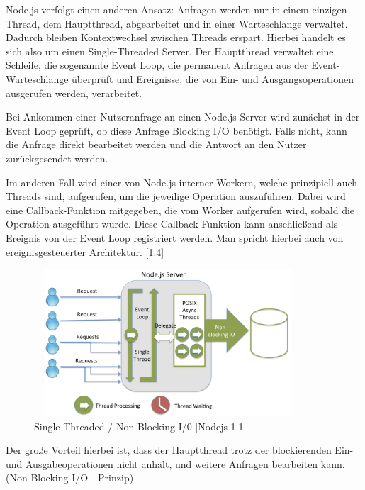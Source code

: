 \newpage

Node.js verfolgt einen anderen Ansatz: Anfragen werden nur in einem einzigen Thread, dem Hauptthread, abgearbeitet und in einer Warteschlange verwaltet. Dadurch bleiben Kontextwechsel zwischen Threads erspart. Hierbei handelt es sich also um einen Single-Threaded Server. Der Hauptthread verwaltet eine Schleife, die sogenannte Event Loop, die permanent Anfragen aus der Event-Warteschlange überprüft und Ereignisse, die von Ein- und Ausgangsoperationen ausgerufen werden, verarbeitet.
\newline

Bei Ankommen einer Nutzeranfrage an einen Node.js Server wird zunächst in der Event Loop geprüft, ob diese Anfrage Blocking I/O benötigt. Falls nicht, kann die Anfrage direkt bearbeitet werden und die Antwort an den Nutzer zurückgesendet werden. 
\newline

Im anderen Fall wird einer von Node.js interner Workern, welche prinzipiell auch Threads sind, aufgerufen, um die jeweilige Operation auszuführen. Dabei wird eine Callback-Funktion mitgegeben, die vom Worker aufgerufen wird, sobald die Operation ausgeführt wurde. Diese Callback-Funktion kann anschließend als Ereignis von der Event Loop registriert werden. Man spricht hierbei auch von ereignisgesteuerter Architektur. [1.4]
\newline
 
\begin{figure}[h]
\centering
\includegraphics[width=10cm, height = 5.5cm]{images/nodejs_nodethreading.png}
\caption{ Single Threaded / Non Blocking I/0 [Nodejs 1.1]}
\end{figure}
 
 
Der große Vorteil hierbei ist, dass der Hauptthread trotz der blockierenden Ein- und Aus\-gabeoperationen nicht anhält, und weitere Anfragen bearbeiten kann. (Non Blocking I/O - Prinzip) 
\newline

